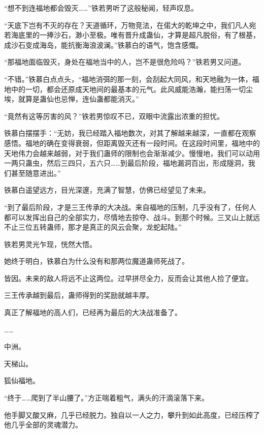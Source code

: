 
\begin{this_body}



“想不到连福地都会毁灭……”铁若男听了这般秘闻，轻声叹息。

“天底下岂有不灭的存在？天道循环，万物竞法，在偌大的乾坤之中，我们凡人宛若海底里的一捧沙石，渺小至极。唯有晋升成蛊仙，才算是超凡脱俗，有了根基，成沙石变成海岛，能抗衡海浪波澜。”铁慕白的语气，饱含感慨。

“那福地面临毁灭，身处在福地当中的人，岂不是很危险吗？”铁若男又问道。

“不错。”铁慕白点点头，“福地消弭的那一刻，会刮起大同风，和天地融为一体，福地中的一切，都会还原成天地间的最基本的元气。此风威能浩瀚，能扫荡一切尘埃，就算是蛊仙也忌惮，连仙蛊都能消灭。”

“竟然有这等厉害的风？”铁若男惊叹不已，双眼中流露出浓重的担忧。

铁慕白摆摆手：“无妨，我已经踏入福地数次，对其了解越来越深，一直都在观察感悟。福地的确在变得衰弱，但距离毁灭还有一段时间。在这段时间里，福地中的天地伟力会越来越弱，对于我们蛊师的限制也会渐渐减少。慢慢地，我们可以动用一两只蛊虫，然后三四只，五六只……到最后阶段，福地漏洞百出，形成隧洞，我们甚至随意进出。”

铁慕白遥望远方，目光深邃，充满了智慧，仿佛已经望见了未来。

“到了最后阶段，才是三王传承的大决战。来自福地的压制，几乎没有了，任何人都可以发挥出自己的全部实力，尽情地去掠夺、战斗。到那个时候。三叉山上就远不止三位五转蛊师，那才是真正的风云会聚，龙蛇起陆。”

铁若男灵光乍现，恍然大悟。

她终于明白，铁慕白为什么没有和那两位魔道蛊师死战了。

皆因。未来的敌人将远不止这两位。过早拼尽全力，反而会让其他人捡了便宜。

三王传承越到最后，蛊师得到的奖励就越丰厚。

真正了解福地的高人们，已经再为最后的大决战准备了。

……

中洲。

天梯山。

狐仙福地。

“终于……爬到了半山腰了。”方正喘着粗气，满头的汗滴滚落下来。

他手脚又酸又麻，几乎已经脱力。独自以一人之力，攀升到如此高度，已经压榨了他几乎全部的灵魂潜力。


\end{this_body}
